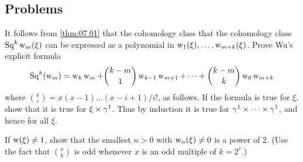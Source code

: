 \documentclass[../main]{subfiles}
\begin{document}
\subsection*{Problems}
\begin{problem}
\label{prob:08.01}
It follows from \ref{thm:07.01} that the cohomology class that the cohomology class $\operatorname{Sq}^k \operatorname{w}_m(\xi)$ can be expressed as a polynomial in $\operatorname{w}_{1}(\xi), \dots, \operatorname{w}_{m+k}(\xi)$. Prove Wu's explicit formula
\[\operatorname{Sq}^{k}(\operatorname{w}_{m})=\operatorname{w}_{k} \operatorname{w}_{m}+\binom{k-m}{1} \operatorname{w}_{k-1} \operatorname{w}_{m+1}+\dots+\binom{k-m}{k}\operatorname{w}_{0} \operatorname{w}_{m+k}\]
where $\binom{x}{i} =x(x-1) \dots(x-i+1) / i !$, as follows. If the formula is true for $\xi$, show that it is true for $\xi \times \gamma^{1}$. Thus by induction it is true for $\gamma^{1} \times \dots \times \gamma^{1}$, and hence for all $\xi$.
\end{problem}
\begin{problem}
\label{prob:08.02}
If $\operatorname{w}(\xi) \neq 1$, show that the smallest $n>0$ with $\operatorname{w}_{ n }(\xi) \neq 0$ is a power of 2. (Use the fact that $\binom{x}{k}$ is odd whenever $x$ is an odd multiple of $k=2^{r}$.)
\end{problem}
\end{document}
